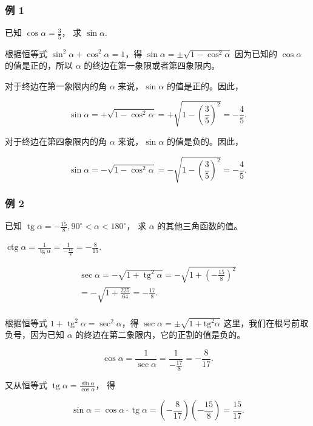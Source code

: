 \subsubsection{例 1}

已知 \(\cos \alpha = \frac{3}{5}\)， 求 \(\sin \alpha\).

 根据恒等式 \(\sin^2\alpha +\cos^2\alpha = 1\)，得
\(\sin\alpha=\pm\sqrt{1-\cos^2\alpha}\) 因为已知的 \(\cos \alpha\)
的值是正的，所以 \(\alpha\) 的终边在第一象限或者第四象限内。

对于终边在第一象限内的角 \(\alpha\) 来说，\(\sin \alpha\)
的值是正的。因此，

\[
\sin \alpha = + \sqrt {1 - \cos^ {2} \alpha} = + \sqrt {1 - \left(\frac {3}{5}\right) ^ {2}} = - \frac {4}{5}.
\]

对于终边在第四象限内的角 \(\alpha\) 来说，\(\sin \alpha\)
的值是负的。因此，

\[
\sin \alpha = - \sqrt {1 - \cos^ {2} \alpha} = - \sqrt {1 - \left(\frac {3}{5}\right) ^ {2}} = - \frac {4}{5}.
\]

\subsubsection{例 2}

已知
\(\operatorname{tg} \alpha = -\frac{15}{8}, 90^{\circ} < \alpha < 180^{\circ}\)，
求 \(\alpha\) 的其他三角函数的值。

\(\operatorname{ctg} \alpha = \frac{1}{\operatorname{tg} \alpha} = \frac{1}{-\frac{15}{8}} = -\frac{8}{15}\).

\[
\begin{array}{l} \sec \alpha = - \sqrt {1 + \operatorname{tg} ^ {2} \alpha} = - \sqrt {1 + \left(- \frac {15}{8}\right) ^ {2}} \\ = - \sqrt {1 + \frac {225}{64}} = - \frac {17}{8}. \\ \end{array}
\]

根据恒等式 \(1+\operatorname{tg}^2\alpha=\sec^2\alpha\)，得
\(\sec \alpha = \pm \sqrt{1 + \mathrm{tg}^2\alpha}\)
这里，我们在根号前取负号，因为已知 \(\alpha\)
的终边在第二象限内，它的正割的值是负的。

\[
\cos \alpha = \frac {1}{\sec \alpha} = \frac {1}{- \frac {17}{8}} = - \frac {8}{17}.
\]

又从恒等式
\(\operatorname{tg} \alpha = \frac{\sin \alpha}{\cos \alpha}\)， 得

\[
\sin \alpha = \cos \alpha \cdot \operatorname{tg} \alpha = \left(- \frac {8}{17}\right) \left(- \frac {15}{8}\right) = \frac {15}{17}.
\]

